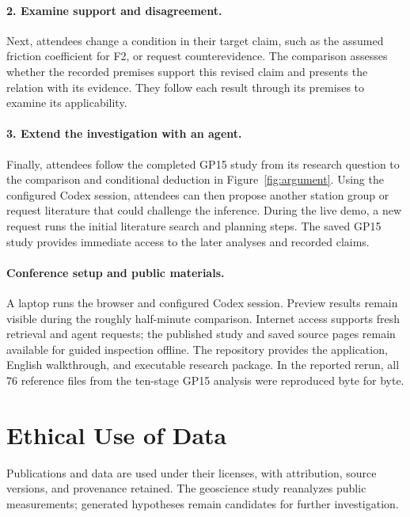 \documentclass[sigconf,screen,review]{acmart}
\begin{document}
\paragraph{2. Examine support and disagreement.}
Next, attendees change a condition in their target claim, such as the assumed friction coefficient for F2, or request counterevidence. The comparison assesses whether the recorded premises support this revised claim and presents the relation with its evidence. They follow each result through its premises to examine its applicability.

\paragraph{3. Extend the investigation with an agent.}
Finally, attendees follow the completed GP15 study from its research question to the comparison and conditional deduction in Figure~\ref{fig:argument}. Using the configured Codex session, attendees can then propose another station group or request literature that could challenge the inference. During the live demo, a new request runs the initial literature search and planning steps. The saved GP15 study provides immediate access to the later analyses and recorded claims.

\paragraph{Conference setup and public materials.}
A laptop runs the browser and configured Codex session. Preview results remain visible during the roughly half-minute comparison. Internet access supports fresh retrieval and agent requests; the published study and saved source pages remain available for guided inspection offline. The repository provides the application, English walkthrough, and executable research package. In the reported rerun, all 76 reference files from the ten-stage GP15 analysis were reproduced byte for byte.

\section{Ethical Use of Data}
Publications and data are used under their licenses, with attribution, source versions, and provenance retained. The geoscience study reanalyzes public measurements; generated hypotheses remain candidates for further investigation.
\end{document}
